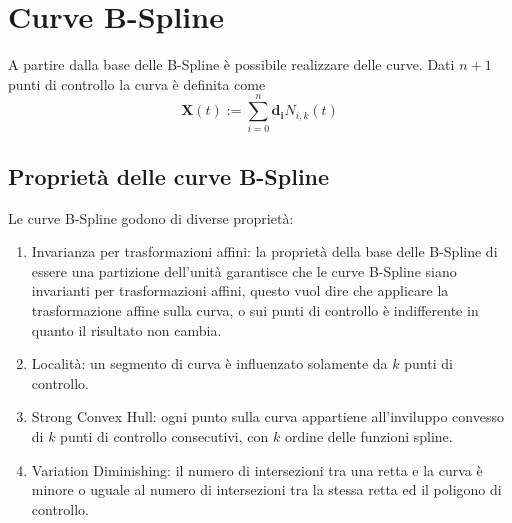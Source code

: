 \documentclass[a4paper, 10pt]{article}
\begin{document}
\section{Curve B-Spline}
A partire dalla base delle B-Spline è possibile realizzare delle curve. Dati $n+1$ punti 
di controllo la curva è definita come 
$$\mathbf{X}(t) := \sum_{i=0}^{n} \mathbf{d_i} N_{i, k}(t)$$

\subsection{Proprietà delle curve B-Spline}
Le curve B-Spline godono di diverse proprietà:
\begin{enumerate}
  \item Invarianza per trasformazioni affini: la proprietà della base delle B-Spline di essere 
  una partizione dell'unità garantisce che le curve B-Spline siano invarianti per trasformazioni affini, questo 
  vuol dire che applicare la trasformazione affine sulla curva, o sui punti di controllo è indifferente in quanto il risultato non cambia.
  \item Località: un segmento di curva è influenzato solamente da $k$ punti di controllo.
  \item Strong Convex Hull: ogni punto sulla curva appartiene all'inviluppo convesso di $k$ punti di controllo consecutivi, con $k$ ordine 
  delle funzioni spline.
  \item Variation Diminishing: il numero di intersezioni tra una retta e la curva è minore o uguale al numero di intersezioni
  tra la stessa retta ed il poligono di controllo.
\end{enumerate}
\end{document}
